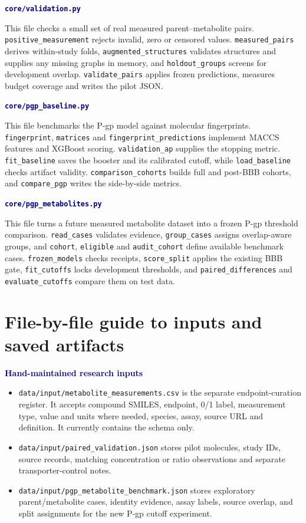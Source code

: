 \documentclass[11pt,a4paper]{article}
\newcommand{\code}[1]{\nolinkurl{#1}}
\newcommand{\lead}[1]{\par\smallskip\textbf{\textcolor{Navy}{#1}}\par\nobreak}
\newcommand{\pagehead}[1]{\clearpage\section{#1}}
\newenvironment{compact}{\begin{itemize}[leftmargin=*,topsep=2pt,itemsep=1pt,parsep=0pt]}{\end{itemize}}
\begin{document}
\lead{\code{core/validation.py}}
This file checks a small set of real measured parent--metabolite pairs. \code{positive_measurement} rejects invalid, zero or censored values. \code{measured_pairs} derives within-study folds, \code{augmented_structures} validates structures and supplies any missing graphs in memory, and \code{holdout_groups} screens for development overlap. \code{validate_pairs} applies frozen predictions, measures budget coverage and writes the pilot JSON.

\lead{\code{core/pgp_baseline.py}}
This file benchmarks the P-gp model against molecular fingerprints. \code{fingerprint}, \code{matrices} and \code{fingerprint_predictions} implement MACCS features and XGBoost scoring. \code{validation_ap} supplies the stopping metric. \code{fit_baseline} saves the booster and its calibrated cutoff, while \code{load_baseline} checks artifact validity. \code{comparison_cohorts} builds full and post-BBB cohorts, and \code{compare_pgp} writes the side-by-side metrics.

\lead{\code{core/pgp_metabolites.py}}
This file turns a future measured metabolite dataset into a frozen P-gp threshold comparison. \code{read_cases} validates evidence, \code{group_cases} assigns overlap-aware groups, and \code{cohort}, \code{eligible} and \code{audit_cohort} define available benchmark cases. \code{frozen_models} checks receipts, \code{score_split} applies the existing BBB gate, \code{fit_cutoffs} locks development thresholds, and \code{paired_differences} and \code{evaluate_cutoffs} compare them on test data.

\pagehead{File-by-file guide to inputs and saved artifacts}
\lead{Hand-maintained research inputs}
\begin{compact}
\item \code{data/input/metabolite_measurements.csv} is the separate endpoint-curation register. It accepts compound SMILES, endpoint, 0/1 label, measurement type, value and units where needed, species, assay, source URL and definition. It currently contains the schema only.
\item \code{data/input/paired_validation.json} stores pilot molecules, study IDs, source records, matching concentration or ratio observations and separate transporter-control notes.
\item \code{data/input/pgp_metabolite_benchmark.json} stores exploratory parent/metabolite cases, identity evidence, assay labels, source overlap, and split assignments for the new P-gp cutoff experiment.
\end{compact}
\end{document}
